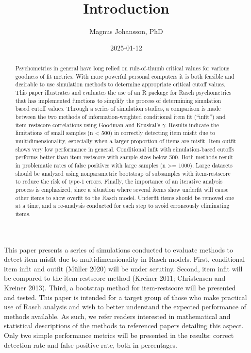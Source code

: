 \documentclass[
  letterpaper,
  DIV=11,
  numbers=noendperiod]{scrartcl}
\title{Introduction}
\author{Magnus Johansson, PhD}
\date{2025-01-12}
\begin{document}
\maketitle
\begin{abstract}
Psychometrics in general have long relied on rule-of-thumb critical
values for various goodness of fit metrics. With more powerful personal
computers it is both feasible and desirable to use simulation methods to
determine appropriate critical cutoff values. This paper illustrates and
evaluates the use of an R package for Rasch psychometrics that has
implemented functions to simplify the process of determining simulation
based cutoff values. Through a series of simulation studies, a
comparison is made between the two methods of information-weighted
conditional item fit (``infit'') and item-restscore correlations using
Goodman and Kruskal's \(\gamma\). Results indicate the limitations of
small samples (n \textless{} 500) in correctly detecting item misfit due
to multidimensionality, especially when a larger proportion of items are
misfit. Item outfit shows very low performance in general. Conditional
infit with simulation-based cutoffs performs better than item-restscore
with sample sizes below 500. Both methods result in problematic rates of
false positives with large samples (n \textgreater= 1000). Large
datasets should be analyzed using nonparametric bootstrap of subsamples
with item-restscore to reduce the risk of type-1 errors. Finally, the
importance of an iterative analysis process is emphasized, since a
situation where several items show underfit will cause other items to
show overfit to the Rasch model. Underfit items should be removed one at
a time, and a re-analysis conducted for each step to avoid erroneously
eliminating items.
\end{abstract}


This paper presents a series of simulations conducted to evaluate
methods to detect item misfit due to multidimensionality in Rasch
models. First, conditional item infit and outfit (Müller 2020) will be
under scrutiny. Second, item infit will be compared to the
item-restscore method (Kreiner 2011; Christensen and Kreiner 2013).
Third, a bootstrap method for item-restscore will be presented and
tested. This paper is intended for a target group of those who make
practical use of Rasch analysis and wish to better understand the
expected performance of methods available. As such, we refer readers
interested in mathematical and statistical descriptions of the methods
to referenced papers detailing this aspect. Only two simple performance
metrics will be presented in the results: correct detection rate and
false positive rate, both in percentages.
\end{document}
